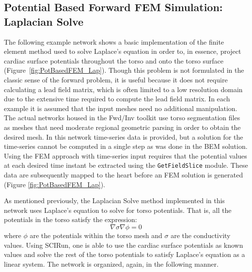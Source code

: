 \subsection{Potential Based Forward FEM Simulation: Laplacian Solve}

The following example network shows a basic implementation of the finite element method used to solve Laplace's equation in order to, in essence, project cardiac surface potentials throughout the torso and onto the torso surface (Figure~\ref{fig:PotBasedFEM_Lap}).
Though this problem is not formulated in the classic sense of the forward problem, it is useful because it does not require calculating a lead field matrix, which is often limited to a low resolution domain due to the extensive time required to compute the lead field matrix.
In each example it is assumed that the input meshes need no additional manipulation.
The actual networks housed in the Fwd/Inv toolkit use torso segmentation files as meshes that need moderate regional geometric parsing in order to obtain the desired mesh.
In this network time-series data is provided, but a solution for the time-series cannot be computed in a single step as was done in the BEM solution.
Using the FEM approach with time-series input requires that the potential values at each desired time instant be extracted using the {\tt GetFieldSlice} module.
These data are subsequently mapped to the heart before an FEM solution is generated (Figure \ref{fig:PotBasedFEM_Lap}).

As mentioned previously, the Laplacian Solve method implemented in this network uses Laplace's equation to solve for torso potentials. That is, all the potentials in the torso satisfy the expression:
\begin{equation*}
\nabla \sigma \nabla \phi = 0
\end{equation*}
\noindent where $\phi$ are the potentials within the torso mesh and $\sigma$ are the conductivity values. Using SCIRun, one is able to use the cardiac surface potentials as known values and solve the rest of the torso potentials to satisfy Laplace's equation as a linear system.
The network is organized, again, in the following manner.



